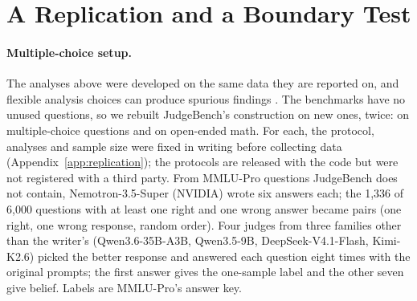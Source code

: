 \documentclass[11pt]{article}
\begin{document}
\section{A Replication and a Boundary Test}
\label{sec:replication}

\paragraph{Multiple-choice setup.}
The analyses above were developed on the same data they are reported on, and flexible analysis choices can produce
spurious findings \citep{simmons2011false}. The benchmarks have no unused questions, so we rebuilt JudgeBench's
construction on new ones, twice: on multiple-choice questions and on open-ended math. For each, the protocol, analyses
and sample size were fixed in writing before collecting data (Appendix~\ref{app:replication}); the protocols are
released with the code but were not registered with a third party. From MMLU-Pro questions JudgeBench does not contain, Nemotron-3.5-Super (NVIDIA)
wrote six answers each; the 1,336 of 6,000 questions with at least one right and one wrong answer became pairs (one
right, one wrong response, random order). Four judges from three families other than the writer's (Qwen3.6-35B-A3B,
Qwen3.5-9B, DeepSeek-V4.1-Flash, Kimi-K2.6) picked the better response and answered each question eight times with
the original prompts; the first answer gives the one-sample label and the other seven give belief. Labels are
MMLU-Pro's answer key.
\end{document}
